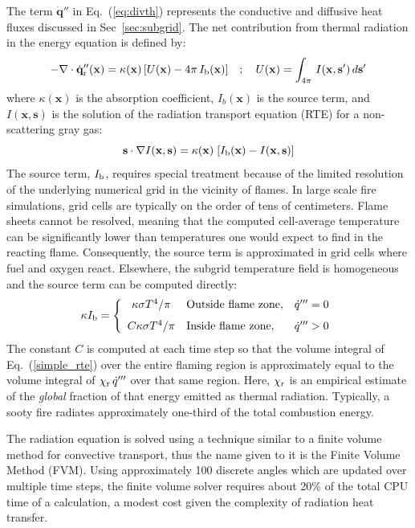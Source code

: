 \documentclass[journal,article,atmosphere,submit,moreauthors,pdftex]{Definitions/mdpi}
\newcommand{\bx}{\mathbf{x}}
\newcommand{\bs}{\mathbf{s}}
\begin{document}
The term $\dot{\mathbf{q}}''$ in Eq.~(\ref{eq:divth}) represents the conductive and diffusive heat fluxes discussed in Sec~\ref{sec:subgrid}. The net contribution from thermal radiation in the energy equation is defined by:
\begin{equation}
   -\nabla \cdot \dot{\mathbf{q}}_{\rm r}''(\bx) =
    \kappa(\bx) \, \left[ U(\bx) - 4 \pi \, I_{\rm b}(\bx) \right]  \quad ; \quad
    U(\bx) = \int_{4\pi} \, I(\bx,\bs') \, d\bs'  \label{simple_rte}
\end{equation}
where $\kappa(\bx)$ is the absorption coefficient, $I_b(\bx)$ is the source term, and $I(\bx,\bs)$ is the solution of the radiation transport equation (RTE) for a non-scattering gray gas:
\begin{equation}
   \bs \cdot \nabla I(\bx,\bs) = \kappa(\bx) \; \left[ I_{\rm b}(\bx) - I(\bx,\bs) \right] \label{bandRTE1}
\end{equation}
The source term, $I_{\rm b}$, requires special treatment because of the limited resolution of the underlying numerical grid in the vicinity of flames. In large scale fire simulations, grid cells are typically on the order of
tens of centimeters. Flame sheets cannot be resolved, meaning that the computed cell-average temperature can be significantly lower than temperatures one would expect to find in the reacting flame. Consequently, the
source term is approximated in grid cells where fuel and oxygen react. Elsewhere, the subgrid temperature field is homogeneous and the source term can be computed directly:
\begin{equation} \kappa I_{\rm b} = \left\{ \begin{array}{cll}
    \kappa \sigma T^4/\pi      & \hbox{Outside flame zone}, & \dot{q}'''=0  \\ [0.1in]
    C \kappa \sigma T^4/\pi  & \hbox{Inside flame zone}, & \dot{q}'''>0
    \end{array} \right.  \label{radapprox1}
\end{equation}
The constant $C$ is computed at each time step so that the volume integral of Eq.~(\ref{simple_rte}) over the entire flaming region is approximately equal to the volume integral of $\chi_{\rm r} \,\dot{q}'''$ over that same region. Here, $\chi_{\rm r}$ is an empirical estimate of the {\em global} fraction of that energy emitted as thermal radiation. Typically, a sooty fire radiates approximately one-third of the total combustion energy.

The radiation equation is solved using a technique similar to a finite volume method for convective transport, thus the name given to it is the Finite Volume Method (FVM). Using approximately 100 discrete angles which are updated over multiple time steps, the finite volume solver requires about 20\% of the total CPU time of a calculation, a modest cost given the complexity of radiation heat transfer.
\end{document}
